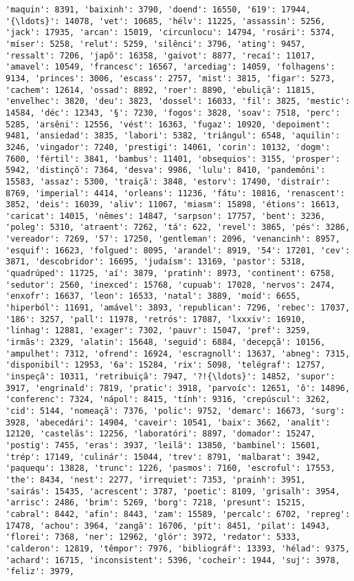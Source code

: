 \begin{Verbatim}[commandchars=\\\{\}]
'maquin': 8391, 'baixinh': 3790, 'doend': 16550, '619': 17944, '{\ldots}': 14078, 'vet': 10685, 'hélv': 11225, 'assassin': 5256, 'jack': 17935, 'arcan': 15019, 'circunlocu': 14794, 'rosári': 5374, 'míser': 5258, 'relut': 5259, 'silênci': 3796, 'ating': 9457, 'ressalt': 7206, 'japõ': 16358, 'gaivot': 8877, 'recaí': 11017, 'amavel': 10549, 'francesc': 16567, 'arcediag': 14059, 'folhagens': 9134, 'princes': 3006, 'escass': 2757, 'mist': 3815, 'figar': 5273, 'cachem': 12614, 'ossad': 8892, 'roer': 8890, 'ebuliçã': 11815, 'envelhec': 3820, 'deu': 3823, 'dossel': 16033, 'fil': 3825, 'mestic': 14584, 'déc': 12343, '§': 7230, 'fogos': 3828, 'soav': 7518, 'perc': 5285, 'arsêni': 12556, 'vést': 16363, 'fugaz': 10920, 'depoiment': 9481, 'ansiedad': 3835, 'labori': 5382, 'triângul': 6548, 'aquilin': 3246, 'vingador': 7240, 'prestigi': 14061, 'corin': 10132, 'dogm': 7600, 'fértil': 3841, 'bambus': 11401, 'obsequios': 3155, 'prosper': 5942, 'distinçõ': 7364, 'desva': 9986, 'lulu': 8410, 'pandemôni': 15583, 'assaz': 5300, 'traiçã': 3848, 'estorv': 17490, 'distraír': 8769, 'imperial': 4414, 'orleans': 11236, 'fátu': 10816, 'renascent': 3852, 'deis': 16039, 'aliv': 11067, 'miasm': 15898, 'étions': 16613, 'caricat': 14015, 'nêmes': 14847, 'sarpson': 17757, 'bent': 3236, 'poleg': 5310, 'atraent': 7262, 'tá': 622, 'revel': 3865, 'pés': 3286, 'vereador': 7269, '57': 17250, 'gentleman': 2096, 'venancinh': 8957, 'esquif': 16623, 'folgued': 8095, 'arandel': 8919, '54': 17201, 'cev': 3871, 'descobridor': 16695, 'judaísm': 13169, 'pastor': 5318, 'quadrúped': 11725, 'aí': 3879, 'pratinh': 8973, 'continent': 6758, 'sedutor': 2560, 'inexced': 15768, 'cupuab': 17028, 'nervos': 2474, 'enxofr': 16637, 'leon': 16533, 'natal': 3889, 'moíd': 6655, 'hiperból': 11691, 'amável': 3893, 'republican': 7296, 'rebec': 17037, '186': 3257, 'pall': 11978, 'retrós': 17087, 'lxxxiv': 16910, 'linhag': 12881, 'exager': 7302, 'pauvr': 15047, 'pref': 3259, 'irmãs': 2329, 'alatin': 15648, 'seguid': 6884, 'decepçã': 10156, 'ampulhet': 7312, 'ofrend': 16924, 'escragnoll': 13637, 'abneg': 7315, 'disponibil': 12953, '6a': 15284, 'rix': 5098, 'telégraf': 12757, 'inspeçã': 10311, 'retribuiçã': 7947, '?!{\ldots}': 14852, 'supor': 3917, 'engrinald': 7819, 'pratic': 3918, 'parvoíc': 12651, 'ô': 14896, 'conferenc': 7324, 'nápol': 8415, 'tính': 9316, 'crepúscul': 3262, 'cid': 5144, 'nomeaçã': 7376, 'polic': 9752, 'demarc': 16673, 'surg': 3928, 'abecedári': 14904, 'caveir': 10541, 'baix': 3662, 'analít': 12120, 'castelãs': 12256, 'laboratóri': 8897, 'domador': 15247, 'postig': 7455, 'eras': 3937, 'leilã': 13850, 'bambinel': 15601, 'trép': 17149, 'culinár': 15044, 'trev': 8791, 'malbarat': 3942, 'paquequ': 13828, 'trunc': 1226, 'pasmos': 7160, 'escroful': 17553, 'the': 8434, 'nest': 2277, 'irrequiet': 7353, 'prainh': 3951, 'sairás': 15435, 'acrescent': 3787, 'poetic': 8109, 'grisalh': 3954, 'arrisc': 2486, 'brim': 5269, 'borg': 7218, 'presunt': 15215, 'cabral': 8442, 'afin': 8443, 'zam': 15589, 'percalc': 6702, 'repreg': 17478, 'achou': 3964, 'zangã': 16706, 'pít': 8451, 'pilat': 14943, 'florei': 7368, 'ner': 12962, 'glór': 3972, 'redator': 5333, 'calderon': 12819, 'têmpor': 7976, 'bibliográf': 13393, 'hélad': 9375, 'achard': 16715, 'inconsistent': 5396, 'cocheir': 1944, 'suj': 3978, 'feliz': 3979, 
\end{Verbatim}
